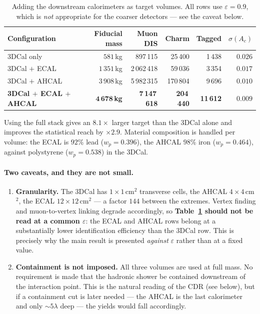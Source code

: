 \documentclass[11pt,a4paper]{article}
\begin{document}
\begin{table}[htbp]
\centering\small
\begin{tabular}{lrrrrr}
\toprule
Configuration & Fiducial mass & Muon DIS & Charm & Tagged & $\sigma(A_c)$ \\
\midrule
3DCal only & $581\,$kg & 897\,115 & 25\,400 & 1\,438 & $0.026$ \\
3DCal $+$ ECAL & $1\,351\,$kg & 2\,062\,418 & 59\,036 & 3\,354 & $0.017$ \\
3DCal $+$ AHCAL & $3\,908\,$kg & 5\,982\,315 & 170\,804 & 9\,696 & $0.010$ \\
\textbf{3DCal $+$ ECAL $+$ AHCAL} & $\mathbf{4\,678\,}$\textbf{kg} & \textbf{7\,147\,618} & \textbf{204\,440} & \textbf{11\,612} & $\mathbf{0.009}$ \\
\bottomrule
\end{tabular}
\caption{Adding the downstream calorimeters as target volumes. All rows use $\varepsilon=0.9$, which is \emph{not} appropriate for the
coarser detectors --- see the caveat below.}
\label{tab:volumes}
\end{table}

Using the full stack gives an $8.1\times$ larger target than the 3DCal alone and
improves the statistical reach by $\times2.9$. Material composition is handled
per volume: the ECAL is $92\%$ lead ($w_p=0.396$), the AHCAL $98\%$ iron
($w_p=0.464$), against polystyrene ($w_p=0.538$) in the 3DCal.

\paragraph{Two caveats, and they are not small.}
\begin{enumerate}
  \item \textbf{Granularity.} The 3DCal has $1\times1\,$cm$^2$ transverse cells,
        the AHCAL $4\times4\,$cm$^2$, the ECAL $12\times12\,$cm$^2$ --- a factor
        $144$ between the extremes. Vertex finding and muon-to-vertex linking
        degrade accordingly, so \textbf{Table~\ref{tab:volumes} should not be
        read at a common $\varepsilon$}: the ECAL and AHCAL rows belong at a
        substantially lower identification efficiency than the 3DCal row. This is
        precisely why the main result is presented \emph{against} $\varepsilon$
        rather than at a fixed value.
  \item \textbf{Containment is not imposed.} All three volumes are used at full
        mass. No requirement is made that the hadronic shower be contained
        downstream of the interaction point. This is the natural reading of the
        CDR (see below), but if a containment cut is later needed --- the AHCAL
        is the last calorimeter and only $\sim\!5\lambda$ deep --- the yields
        would fall accordingly.
\end{enumerate}
\end{document}

